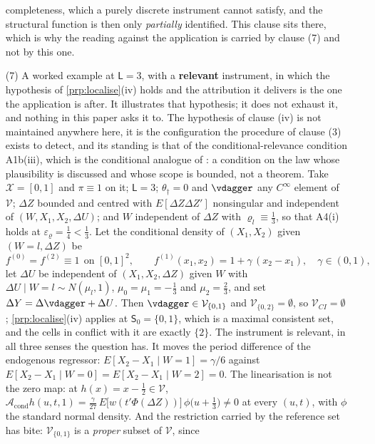 \begin{remark}
\begin{enumerate}
completeness, which a purely discrete instrument cannot satisfy, and the structural function is then
only \emph{partially} identified. This clause sits there, which is why the reading against the
application is carried by clause \textup{(7)} and not by this one.
\item[(7)] A worked example at $\mathsf L=3$, with a \textbf{relevant} instrument, in which the
hypothesis of \cref{prp:localise}\textup{(iv)} holds and the attribution it delivers is the one the
application is after. It illustrates that hypothesis; it does not exhaust it, and nothing in this
paper asks it to. The hypothesis of clause \textup{(iv)} is not maintained anywhere here, it is the
configuration the procedure of clause \textup{(3)} exists to detect, and its standing is that of the
conditional-relevance condition A1b(iii), which is the conditional analogue of
\citet[Assumption~2.2]{centorrinofeveflorens2019}: a condition on the law whose plausibility is
discussed and whose scope is bounded, not a theorem. Take
$\mathcal X=[0,1]$ and $\pi\equiv1$ on it; $\mathsf L=3$; $\theta_\dagger=0$ and $\vdagger$ any
$C^{\infty}$ element of $\mathcal V$; $\Delta Z$ bounded and centred with $E[\Delta Z\Delta Z']$
nonsingular and independent of $(W,X_1,X_2,\Delta U)$; and $W$ independent of $\Delta Z$ with
$\varrho_l\equiv\tfrac13$, so that A4(i) holds at $\varepsilon_\varrho=\tfrac14<\tfrac13$. Let the
conditional density of $(X_1,X_2)$ given $(W=l,\Delta Z)$ be
\[
f^{(0)}=f^{(2)}\equiv1\ \ \text{on }[0,1]^{2},
\qquad
f^{(1)}(x_1,x_2)=1+\gamma\,(x_2-x_1),\quad\gamma\in(0,1),
\]
let $\Delta U$ be independent of $(X_1,X_2,\Delta Z)$ given $W$ with
$\Delta U\mid W=l\sim N(\mu_l,1)$, $\mu_0=\mu_1=-\tfrac13$ and $\mu_2=\tfrac23$, and set
$\Delta Y=\Delta\vdagger+\Delta U$. Then $\vdagger\in\mathcal V_{\{0,1\}}$ and
$\mathcal V_{\{0,2\}}=\emptyset$, so $\mathcal V_{CI}=\emptyset$;
\cref{prp:localise}\textup{(iv)} applies at $\mathsf S_0=\{0,1\}$, which is a maximal consistent set, and
the cells in conflict with it are exactly $\{2\}$.
The instrument is relevant, in all three senses the question has. It moves the period difference
of the endogenous regressor: $E[X_2-X_1\mid W=1]=\gamma/6$ against
$E[X_2-X_1\mid W=0]=E[X_2-X_1\mid W=2]=0$. The linearisation is not the zero map: at
$h(x)=x-\tfrac12\in\mathcal V$,
$\mathcal A_{\mathrm{cond}}h(u,t,1)=\tfrac{\gamma}{27}\,E\big[w(t'\Phi(\Delta Z))\big]\,\phi\big(u+\tfrac13\big)\neq0$
at every $(u,t)$, with $\phi$ the standard normal density. And the restriction carried by the reference
set has bite: $\mathcal V_{\{0,1\}}$ is a \emph{proper} subset of $\mathcal V$, since

\end{enumerate}
\end{remark}
